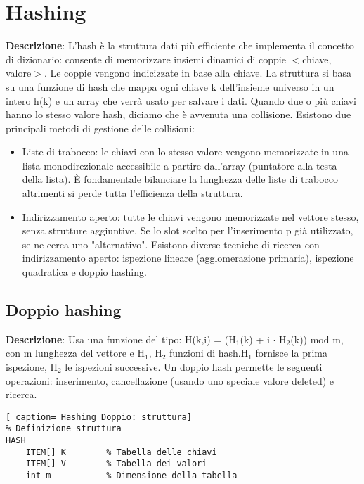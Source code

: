 \documentclass[../cheatSheetAlgoritmi.tex]{subfiles}
\begin{document}
\chapter{Hashing}
\textbf{Descrizione}: L'hash è la struttura dati più efficiente che implementa il concetto di dizionario: consente di memorizzare insiemi dinamici di coppie $<$chiave, valore$>$. Le coppie vengono indicizzate in base alla chiave. La struttura si basa su una funzione di hash che mappa ogni chiave k dell'insieme universo in un intero h(k)
e un array  che verrà usato per salvare i dati. Quando due o più chiavi hanno lo stesso valore hash, diciamo che è avvenuta una collisione. Esistono due principali metodi di gestione delle collisioni: 
\begin{itemize}
 	\item Liste di trabocco: le chiavi con lo stesso valore vengono memorizzate in una lista monodirezionale accessibile a partire dall'array (puntatore alla testa della lista). È fondamentale bilanciare la lunghezza delle liste di trabocco altrimenti si perde tutta l'efficienza della struttura. 
 	\item Indirizzamento aperto: tutte le chiavi vengono memorizzate nel vettore stesso, senza strutture aggiuntive. Se lo slot scelto per l'inserimento p già utilizzato, se ne cerca uno "alternativo". Esistono diverse tecniche di ricerca con indirizzamento aperto: ispezione lineare (agglomerazione primaria), ispezione quadratica e doppio hashing. 
\end{itemize}

\section{Doppio hashing}
\textbf{Descrizione}: Usa una funzione del tipo: H(k,i) = (H$_{1}$(k) + i $\cdot$ H$_{2}$(k)) mod m, con m lunghezza del vettore e H$_{1}$, H$_{2}$ funzioni di hash.H$_{1}$ fornisce la prima ispezione, H$_{2}$ le ispezioni successive. Un doppio hash permette le seguenti operazioni: inserimento, cancellazione (usando uno speciale valore deleted) e ricerca. 
\begin{lstlisting}[ caption= Hashing Doppio: struttura]
% Definizione struttura
HASH
	ITEM[] K		% Tabella delle chiavi
	ITEM[] V		% Tabella dei valori
	int m			% Dimensione della tabella
\end{lstlisting}
 
\end{document}
